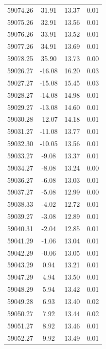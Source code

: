 \begin{longtable}{|c|c|c|c|}
 59074.26 &   31.91 &       13.37 &          0.01 \\
 59075.26 &   32.91 &       13.56 &          0.01 \\
 59076.26 &   33.91 &       13.52 &          0.01 \\
 59077.26 &   34.91 &       13.69 &          0.01 \\
 59078.25 &   35.90 &       13.73 &          0.00 \\
 59026.27 &  -16.08 &       16.20 &          0.03 \\
 59027.27 &  -15.08 &       15.45 &          0.03 \\
 59028.27 &  -14.08 &       14.98 &          0.01 \\
 59029.27 &  -13.08 &       14.60 &          0.01 \\
 59030.28 &  -12.07 &       14.18 &          0.01 \\
 59031.27 &  -11.08 &       13.77 &          0.01 \\
 59032.30 &  -10.05 &       13.56 &          0.01 \\
 59033.27 &   -9.08 &       13.37 &          0.01 \\
 59034.27 &   -8.08 &       13.24 &          0.00 \\
 59036.27 &   -6.08 &       13.03 &          0.01 \\
 59037.27 &   -5.08 &       12.99 &          0.00 \\
 59038.33 &   -4.02 &       12.72 &          0.01 \\
 59039.27 &   -3.08 &       12.89 &          0.01 \\
 59040.31 &   -2.04 &       12.85 &          0.01 \\
 59041.29 &   -1.06 &       13.04 &          0.01 \\
 59042.29 &   -0.06 &       13.05 &          0.01 \\
 59043.29 &    0.94 &       13.21 &          0.01 \\
 59047.29 &    4.94 &       13.50 &          0.01 \\
 59048.29 &    5.94 &       13.42 &          0.01 \\
 59049.28 &    6.93 &       13.40 &          0.02 \\
 59050.27 &    7.92 &       13.44 &          0.02 \\
 59051.27 &    8.92 &       13.46 &          0.01 \\
 59052.27 &    9.92 &       13.49 &          0.01 \\

\end{longtable}
